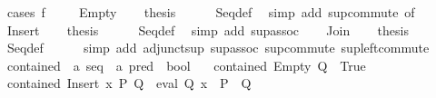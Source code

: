 \begin{isabellebody}
%
\isadelimproof
%
\endisadelimproof
%
\isatagproof
{}\isamarkupfalse%
\ {\isacharparenleft}{\kern0pt}cases\ {\isachardoublequoteopen}f\ {\isacharparenleft}{\kern0pt}{\isacharparenright}{\kern0pt}{\isachardoublequoteclose}{\isacharparenright}{\kern0pt}\isanewline
\ \ \isamarkupfalse%
\ Empty\isanewline
\ \ \isamarkupfalse%
\ {\isacharquery}{\kern0pt}thesis\isanewline
\ \ \ \ \isamarkupfalse%
\ Seq{\isacharunderscore}{\kern0pt}def\ \isamarkupfalse%
\ {\isacharparenleft}{\kern0pt}simp\ add{\isacharcolon}{\kern0pt}\ sup{\isacharunderscore}{\kern0pt}commute\ {\isacharbrackleft}{\kern0pt}of\ {\isachardoublequoteopen}{\isasymbottom}{\isachardoublequoteclose}{\isacharbrackright}{\kern0pt}{\isacharparenright}{\kern0pt}\isanewline
{}\isamarkupfalse%
\isanewline
\ \ \isamarkupfalse%
\ Insert\isanewline
\ \ \isamarkupfalse%
\ {\isacharquery}{\kern0pt}thesis\isanewline
\ \ \ \ \isamarkupfalse%
\ Seq{\isacharunderscore}{\kern0pt}def\ \isamarkupfalse%
\ {\isacharparenleft}{\kern0pt}simp\ add{\isacharcolon}{\kern0pt}\ sup{\isacharunderscore}{\kern0pt}assoc{\isacharparenright}{\kern0pt}\isanewline
{}\isamarkupfalse%
\isanewline
\ \ \isamarkupfalse%
\ Join\isanewline
\ \ \isamarkupfalse%
\ {\isacharquery}{\kern0pt}thesis\isanewline
\ \ \ \ \isamarkupfalse%
\ Seq{\isacharunderscore}{\kern0pt}def\isanewline
\ \ \ \ \isamarkupfalse%
\ {\isacharparenleft}{\kern0pt}simp\ add{\isacharcolon}{\kern0pt}\ adjunct{\isacharunderscore}{\kern0pt}sup\ sup{\isacharunderscore}{\kern0pt}assoc\ sup{\isacharunderscore}{\kern0pt}commute\ sup{\isacharunderscore}{\kern0pt}left{\isacharunderscore}{\kern0pt}commute{\isacharparenright}{\kern0pt}\isanewline
{}\isamarkupfalse%
%
\endisatagproof
{\isafoldproof}%
%
\isadelimproof
\isanewline
%
\endisadelimproof
\isanewline
{}\isamarkupfalse%
\ contained\ {\isacharcolon}{\kern0pt}{\isacharcolon}{\kern0pt}\ {\isachardoublequoteopen}{\isacharprime}{\kern0pt}a\ seq\ {\isasymRightarrow}\ {\isacharprime}{\kern0pt}a\ pred\ {\isasymRightarrow}\ bool{\isachardoublequoteclose}\ \isanewline
\ \ {\isachardoublequoteopen}contained\ Empty\ Q\ {\isasymlongleftrightarrow}\ True{\isachardoublequoteclose}\isanewline
{\isacharbar}{\kern0pt}\ {\isachardoublequoteopen}contained\ {\isacharparenleft}{\kern0pt}Insert\ x\ P{\isacharparenright}{\kern0pt}\ Q\ {\isasymlongleftrightarrow}\ eval\ Q\ x\ {\isasymand}\ P\ {\isasymle}\ Q{\isachardoublequoteclose}\isanewline

\end{isabellebody}
